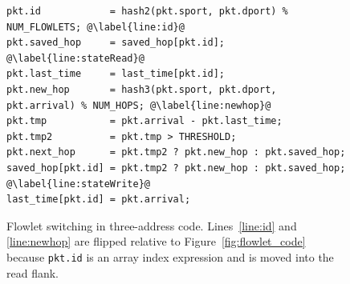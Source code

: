 \begin{figure}[!t]
\begin{minipage}{\textwidth}
\begin{lstlisting}[style=customc]
pkt.id            = hash2(pkt.sport, pkt.dport) % NUM_FLOWLETS; @\label{line:id}@
pkt.saved_hop     = saved_hop[pkt.id]; @\label{line:stateRead}@
pkt.last_time     = last_time[pkt.id];
pkt.new_hop       = hash3(pkt.sport, pkt.dport, pkt.arrival) % NUM_HOPS; @\label{line:newhop}@
pkt.tmp           = pkt.arrival - pkt.last_time;
pkt.tmp2          = pkt.tmp > THRESHOLD;
pkt.next_hop      = pkt.tmp2 ? pkt.new_hop : pkt.saved_hop;
saved_hop[pkt.id] = pkt.tmp2 ? pkt.new_hop : pkt.saved_hop; @\label{line:stateWrite}@
last_time[pkt.id] = pkt.arrival;
\end{lstlisting}
\caption[title2]{Flowlet switching in three-address
code. Lines~\ref{line:id} and \ref{line:newhop} are flipped relative
to Figure~\ref{fig:flowlet_code} because {\tt pkt.id} is an array index expression and is
moved into the read flank.}
\label{fig:three_address}
\end{minipage}
\vspace{-0.3cm}
\end{figure}

